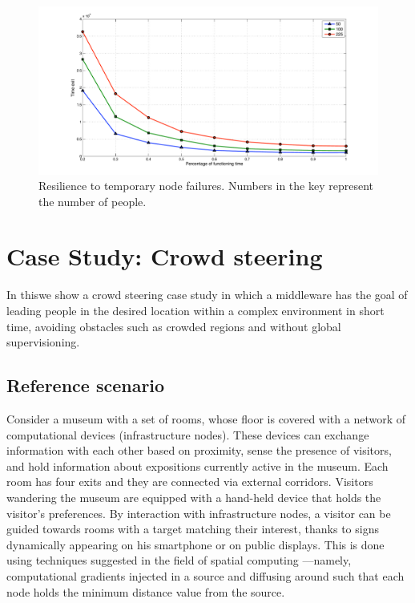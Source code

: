\documentclass[12pt,a4paper,twoside,openright]{book}
\begin{document}
\begin{figure}
  \begin{center}
  \includegraphics[width=\columnwidth]{img/resilience}
  \end{center}
  \caption{Resilience to temporary node failures. Numbers in the key represent the number of people.}
  \label{fig:resilience}
\end{figure}


\chapter{Case Study: Crowd steering}
\label{jos-museum}
In this\levelText{}we show a crowd steering case study in which a middleware has the goal of leading people in the desired location within a complex environment in short time, avoiding obstacles such as crowded regions and without global supervisioning. 

\section{Reference scenario}

Consider a museum with a  set of rooms, whose floor is covered with a network of computational devices (infrastructure nodes).
%
These devices can exchange information with each other based on proximity, sense the presence of visitors, and hold information about expositions currently active in the museum.
%
Each room has four exits and they are connected via external corridors. Visitors wandering the museum are equipped with a hand-held device that holds the visitor's preferences.
%
By interaction with infrastructure nodes, a visitor can be guided towards rooms with a target matching their interest, thanks to signs dynamically appearing on his smartphone or on public displays.
%
This is done using techniques suggested in the field of spatial computing \cite{VCMZ-TAAS2011}---namely, computational gradients injected in a source and diffusing around such that each node holds the minimum distance value from the source.
\end{document}
